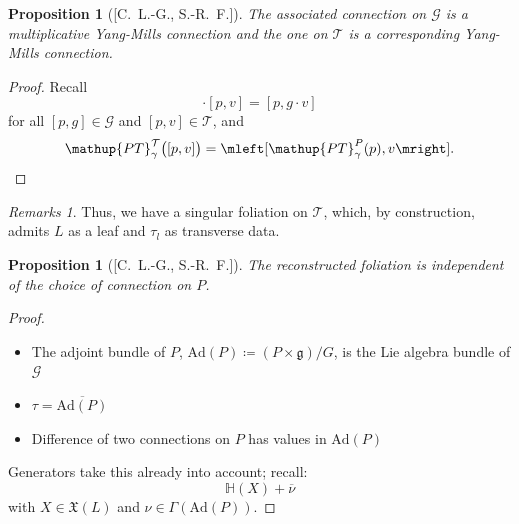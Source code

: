 \documentclass[
aspectratio=3218, 
10pt
]{beamer}
\def\bes{\begin{equation*}}
\def\ees{\end{equation*}}
\theoremstyle{plain}
\newtheorem{proposition}[theorem]{Proposition}
\theoremstyle{remark}
\newtheorem*{remark}{Remarks}
\begin{document}
{\begin{frame}
\end{frame}

\begin{frame}
\begin{proposition}[{[C.\ L.-G., S.-R.\ F.]}]\vspace{.5pt}
The associated connection on $\mathcal{G}$ is a multiplicative Yang-Mills connection and the one on $\mathcal{T}$ is a corresponding Yang-Mills connection.
\end{proposition}

\begin{proof}
Recall
\bes
[p, g] \cdot [p, v]
=
[p, g \cdot v]
\ees
for all $[p, g] \in \mathcal{G}$ and $[p, v] \in \mathcal{T}$, and
\bes
\mathup{PT}^{\mathcal{T}}_\gamma\bigl( [p, v] \bigr)
=
\mleft[ \mathup{PT}^{P}_\gamma(p), v \mright].
\ees
\end{proof}

\pause

\begin{remark}
Thus, we have a singular foliation on $\mathcal{T}$, which, by construction, admits $L$ as a leaf and $\tau_l$ as transverse data.
\end{remark}
\end{frame}


\begin{frame}
\begin{proposition}[{[C.\ L.-G., S.-R.\ F.]}]\vspace{.5pt}
The reconstructed foliation is independent of the choice of connection on $P$.
\end{proposition}
\pause
\begin{proof}
\begin{itemize}
	\item The adjoint bundle of $P$, $\mathup{Ad}(P) \coloneqq (P \times \mathfrak{g})/G$, is the Lie algebra bundle of $\mathcal{G}$
	\item $\tau = \overline{\mathup{Ad}(P)}$
	\item Difference of two connections on $P$ has values in $\mathup{Ad}(P)$
\end{itemize}
Generators take this already into account; recall:
\bes
\mathbb{H}(X) + \overline{\nu}
\ees
with $X \in \mathfrak{X}(L)$ and $\nu \in \Gamma(\mathup{Ad}(P))$.
\end{proof}
\end{frame}


}
\end{document}

